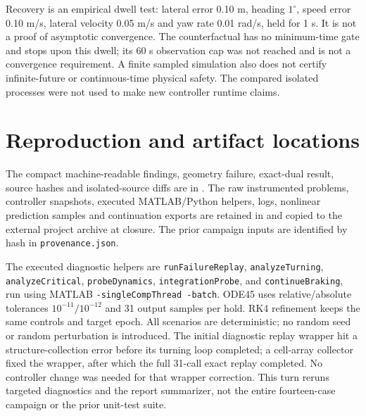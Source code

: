 \documentclass[11pt]{article}
\begin{document}
Recovery is an empirical dwell test: lateral error 0.10 m, heading
$1^\circ$, speed error 0.10 m/s, lateral velocity 0.05 m/s and yaw rate
0.01 rad/s, held for 1 s. It is not a proof of asymptotic convergence. The
counterfactual has no minimum-time gate and stops upon this dwell; its
60 s observation cap was not reached and is not a convergence requirement.
A finite sampled simulation also does not certify infinite-future or
continuous-time physical safety. The compared isolated processes were not
used to make new controller runtime claims.

\section{Reproduction and artifact locations}
The compact machine-readable findings, geometry failure, exact-dual result,
source hashes and isolated-source diffs are in
. The raw instrumented
problems, controller snapshots, executed MATLAB/Python helpers, logs,
nonlinear prediction samples and continuation exports are retained in
and copied to the external project archive at closure. The prior campaign
inputs are identified by hash in \texttt{provenance.json}.

The executed diagnostic helpers are \texttt{runFailureReplay},
\texttt{analyzeTurning}, \texttt{analyzeCritical}, \texttt{probeDynamics},
\texttt{integrationProbe}, and \texttt{continueBraking}, run using MATLAB
\texttt{-singleCompThread -batch}. ODE45 uses relative/absolute tolerances
$10^{-11}/10^{-12}$ and 31 output samples per hold. RK4 refinement keeps the
same controls and target epoch. All scenarios are deterministic; no random
seed or random perturbation is introduced. The initial diagnostic replay
wrapper hit a structure-collection error before its turning loop completed;
a cell-array collector fixed the wrapper, after which the full 31-call
exact replay completed. No controller change was needed for that wrapper
correction. This turn reruns targeted diagnostics and the report summarizer,
not the entire fourteen-case campaign or the prior unit-test suite.
\end{document}
